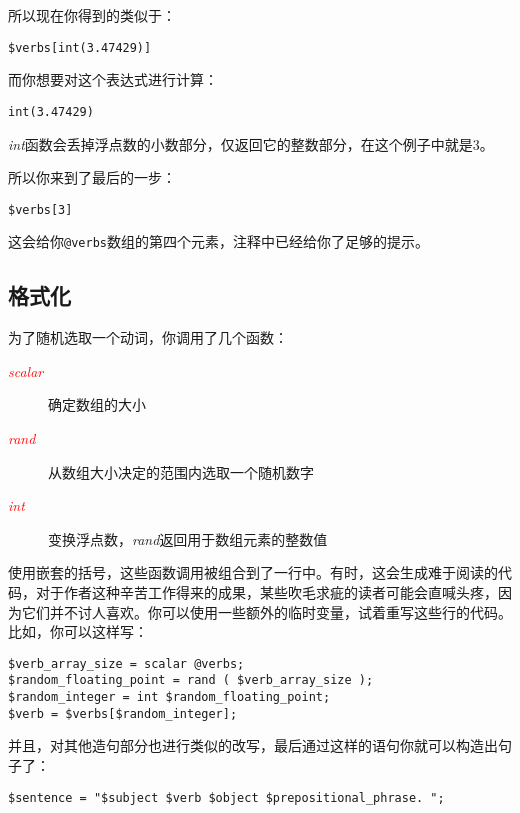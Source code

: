 所以现在你得到的类似于：

\begin{lstlisting}
$verbs[int(3.47429)] 
\end{lstlisting}

而你想要对这个表达式进行计算：

\begin{lstlisting}
int(3.47429) 
\end{lstlisting}

\textit{int}函数会丢掉浮点数的小数部分，仅返回它的整数部分，在这个例子中就是3。

所以你来到了最后的一步：

\begin{lstlisting}
$verbs[3]
\end{lstlisting}

这会给你\verb|@verbs|数组的第四个元素，注释中已经给你了足够的提示。

\subsection{格式化}
为了随机选取一个动词，你调用了几个函数：

\begin{description}
  \item[\textcolor{red}{\textit{scalar}}] 确定数组的大小
  \item[\textcolor{red}{\textit{rand}}] 从数组大小决定的范围内选取一个随机数字
  \item[\textcolor{red}{\textit{int}}] 变换浮点数，\textit{rand}返回用于数组元素的整数值
\end{description}

使用嵌套的括号，这些函数调用被组合到了一行中。有时，这会生成难于阅读的代码，对于作者这种辛苦工作得来的成果，某些吹毛求疵的读者可能会直喊头疼，因为它们并不讨人喜欢。你可以使用一些额外的临时变量，试着重写这些行的代码。比如，你可以这样写：

\begin{lstlisting}
$verb_array_size = scalar @verbs;
$random_floating_point = rand ( $verb_array_size );
$random_integer = int $random_floating_point;
$verb = $verbs[$random_integer];
\end{lstlisting}

并且，对其他造句部分也进行类似的改写，最后通过这样的语句你就可以构造出句子了：

\begin{lstlisting}
$sentence = "$subject $verb $object $prepositional_phrase. ";
\end{lstlisting}

